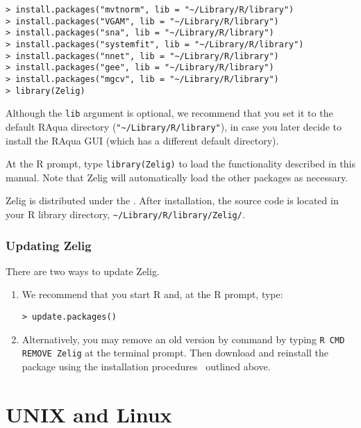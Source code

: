 \begin{enumerate}
\begin{enumerate}
\begin{verbatim}
> install.packages("mvtnorm", lib = "~/Library/R/library")
> install.packages("VGAM", lib = "~/Library/R/library")
> install.packages("sna", lib = "~/Library/R/library")
> install.packages("systemfit", lib = "~/Library/R/library")
> install.packages("nnet", lib = "~/Library/R/library")
> install.packages("gee", lib = "~/Library/R/library")
> install.packages("mgcv", lib = "~/Library/R/library")
> library(Zelig)
\end{verbatim}
      Although the {\tt lib} argument is optional, we recommend that
      you set it to the default RAqua directory
      (\verb|"~/Library/R/library"|), in case you later decide to
      install the RAqua GUI (which has a different default directory).
      \end{enumerate}
\end{enumerate}
  
At the R prompt, type \texttt{library(Zelig)} to load the
functionality described in this manual.  Note that Zelig will
automatically load the other packages as necessary.
  
Zelig is distributed under the .  After
installation, the source code is located in your R library directory,
{\tt \~{}/Library/R/library/Zelig/}.

\subsubsection{Updating Zelig}
  
There are two ways to update Zelig.
\begin{enumerate}

\item We recommend that you start R and, at the R prompt, type:
\begin{verbatim}
> update.packages()
\end{verbatim}
  
\item Alternatively, you may remove an old version by command by
  typing {\tt R CMD REMOVE Zelig} at the terminal prompt.  Then
  download and reinstall the package using the installation
  procedures~ outlined above.
\end{enumerate}

\section{UNIX and Linux}\label{ss:unix}

